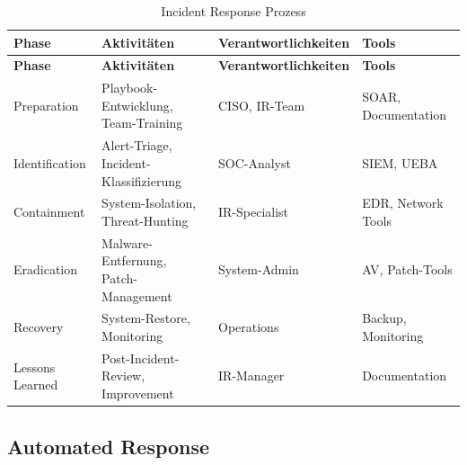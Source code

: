 \documentclass[11pt,a4paper]{article}
\begin{document}
\begin{longtable}{|l|p{3cm}|p{4cm}|p{3cm}|}
\caption{Incident Response Prozess} \\
\hline
\textbf{Phase} & \textbf{Aktivitäten} & \textbf{Verantwortlichkeiten} & \textbf{Tools} \\
\hline
\endfirsthead
\hline
\textbf{Phase} & \textbf{Aktivitäten} & \textbf{Verantwortlichkeiten} & \textbf{Tools} \\
\hline
\endhead
\hline
\endfoot
\hline
\endlastfoot

Preparation & Playbook-Entwicklung, Team-Training & CISO, IR-Team & SOAR, Documentation \\
\hline
Identification & Alert-Triage, Incident-Klassifizierung & SOC-Analyst & SIEM, UEBA \\
\hline
Containment & System-Isolation, Threat-Hunting & IR-Specialist & EDR, Network Tools \\
\hline
Eradication & Malware-Entfernung, Patch-Management & System-Admin & AV, Patch-Tools \\
\hline
Recovery & System-Restore, Monitoring & Operations & Backup, Monitoring \\
\hline
Lessons Learned & Post-Incident-Review, Improvement & IR-Manager & Documentation \\
\hline
\end{longtable}

\subsection{Automated Response}
\end{document}

